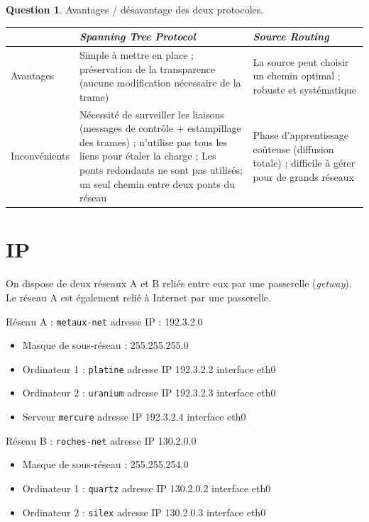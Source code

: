 \documentclass[11pt,english,french]{scrreprt}
\theoremstyle{remark}
\theoremstyle{definition}
\newtheorem{ques}{Question}[section]
\begin{document}
\begin{ques}
	Avantages / désavantage des deux protocoles.
	
	\begin{tabularx}{\textwidth}{lXX}
		\toprule 
		& \emph{Spanning Tree Protocol} & \emph{Source Routing}\tabularnewline
		\midrule
		\midrule
		Avantages & Simple à mettre en place ; préservation de la transparence (aucune modification nécessaire de la trame) & La source peut choisir un chemin optimal ; robuste et systématique\tabularnewline
		\midrule
		Inconvénients & Nécessité de surveiller les liaisons (messages de contrôle + estampillage des trames) ; n'utilise pas tous les liens pour étaler la charge ; Les ponts redondants ne sont pas utilisés; un seul chemin entre deux ponts du réseau &  Phase d'apprentissage coûteuse (diffusion totale) ; difficile à gérer pour de grands réseaux\tabularnewline
		\bottomrule
	\end{tabularx}
\end{ques}

\clearpage

\section{IP} %

On dispose de deux réseaux A et B reliés entre eux par une passerelle (\emph{getway}). Le réseau A est également relié à Internet par une passerelle.

Réseau A : \lstinline!metaux-net! adresse IP : 192.3.2.0 \begin{itemize}
	\item Masque de sous-réseau : 255.255.255.0
	\item Ordinateur 1 : \lstinline!platine! adresse IP 192.3.2.2 interface eth0
	\item Ordinateur 2 : \lstinline!uranium! adresse IP 192.3.2.3 interface eth0
	\item Serveur \lstinline!mercure! adresse IP 192.3.2.4 interface eth0
\end{itemize}

Réseau B : \lstinline!roches-net! adresse IP 130.2.0.0 \begin{itemize}
	\item Masque de sous-réseau : 255.255.254.0
	\item Ordinateur 1 : \lstinline!quartz! adresse IP 130.2.0.2 interface eth0
	\item Ordinateur 2 : \lstinline!silex! adresse IP 130.2.0.3 interface eth0
\end{itemize}
\end{document}
